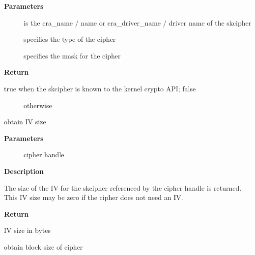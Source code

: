 \documentclass[a4paper,8pt,english]{sphinxmanual}
\begin{document}
\textbf{Parameters}
\begin{description}
\item[{}] \leavevmode
is the cra\_name / name or cra\_driver\_name / driver name of the
skcipher

\item[{}] \leavevmode
specifies the type of the cipher

\item[{}] \leavevmode
specifies the mask for the cipher

\end{description}

\textbf{Return}
\begin{description}
\item[{true when the skcipher is known to the kernel crypto API; false}] \leavevmode
otherwise

\end{description}

\begin{fulllineitems}
\label{crypto/api-skcipher:c.crypto_skcipher_ivsize}
obtain IV size

\end{fulllineitems}


\textbf{Parameters}
\begin{description}
\item[{}] \leavevmode
cipher handle

\end{description}

\textbf{Description}

The size of the IV for the skcipher referenced by the cipher handle is
returned. This IV size may be zero if the cipher does not need an IV.

\textbf{Return}

IV size in bytes

\begin{fulllineitems}
\label{crypto/api-skcipher:c.crypto_skcipher_blocksize}
obtain block size of cipher

\end{fulllineitems}
\end{document}
